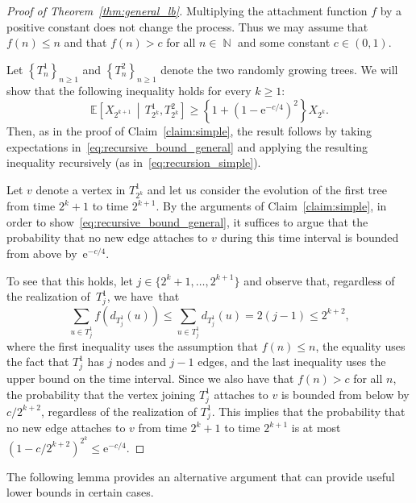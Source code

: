 \documentclass[11pt]{article}
\numberwithin{equation}{section}
\DeclareMathOperator{\N}{\mathbb{N}} %
\newcommand{\E}{\mathbb{E}} %
\newcommand{\e}{\mathrm e}
\theoremstyle{definition}
\begin{document}
\begin{proof}[Proof of Theorem~\ref{thm:general_lb}]
Multiplying the attachment function $f$ by a positive constant does not change the process. Thus we may assume that $f(n)\leq n$ and that $f(n)>c$ for all $n\in \N$ and some constant $c \in (0,1)$. 


Let $\left\{ T_{n}^{1} \right\}_{n \geq 1}$ and $\left\{ T_{n}^{2} \right\}_{n \geq 1}$ denote the two randomly growing trees. We will show that the following inequality holds for every $k \geq 1$: 
\begin{equation}\label{eq:recursive_bound_general}
\E \left[  X_{2^{k+1}} \, \middle| \, T_{2^{k}}^{1}, T_{2^{k}}^{2} \right] \geq \left\{ 1 + \left(1 - \e^{-c/4} \right)^{2} \right\} X_{2^{k}}.
\end{equation}
Then, as in the proof of Claim~\ref{claim:simple}, 
the result follows by taking expectations in~\eqref{eq:recursive_bound_general} 
and applying the resulting inequality recursively (as in~\eqref{eq:recursion_simple}).

Let $v$ denote a vertex in $T_{2^{k}}^{1}$ 
and let us consider the evolution of the first tree from time $2^{k} + 1$ to time $2^{k+1}$. 
By the arguments of Claim~\ref{claim:simple}, 
in order to show~\eqref{eq:recursive_bound_general}, 
it suffices to argue that 
the probability that no new edge attaches to $v$ during this time interval is bounded from above by~$\e^{-c/4}$. 

To see that this holds, 
let $j \in \{ 2^{k}+1, \ldots, 2^{k+1} \}$ and observe that, regardless of the realization of~$T_{j}^{1}$, we have~that 
\[
\sum_{u \in T_{j}^{1}} f( d_{T_{j}^{1}}(u)) 
\leq \sum_{u \in T_{j}^{1}} d_{T_{j}^{1}} (u) 
= 2(j-1) 
\leq 2^{k+2},
\]
where the first inequality uses the assumption that $f(n) \leq n$, 
the equality uses the fact that $T_{j}^{1}$ has $j$ nodes and $j-1$ edges, and the last inequality uses the upper bound on the time interval. 
Since we also have that $f(n) > c$ for all $n$, 
the probability that the vertex joining $T_{j}^{1}$ attaches to $v$ is bounded from below by $c/ 2^{k+2}$, 
regardless of the realization of $T_{j}^{1}$. 
This implies that the probability that no new edge attaches to $v$ from time $2^{k} + 1$ to time $2^{k+1}$ is at most 
$(1 - c / 2^{k+2})^{2^{k}} \leq \e^{-c/4}$. 
\end{proof}

The following lemma provides an alternative argument that can provide useful lower bounds in certain cases.
\end{document}
